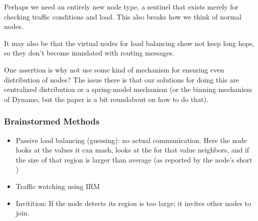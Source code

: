 Perhaps we need an entirely new node type, a sentinel that exists merely for checking traffic conditions and load.
This also breaks how we think of normal nodes.

It may also be that the virtual nodes for load balancing show not keep long hops, so they don't become inundated with routing messages.

One assertion is why not use some kind of mechanism for ensuring even distribution of nodes?
The issue there is that our solutions for doing this are centralized distribution or a spring-model mechanism (or the binning mechanism of Dynamo, but the paper is a bit roundabout on how to do that).

\subsubsection{Brainstormed Methods}


\begin{itemize}
	\item Passive load balancing (guessing):  no actual communication.
	Here the node looks at the values it can mash, looks at the for that value neighbors, and if the size of that region is larger than average (as reported by the node's short )
	\item Traffic watching using IRM
	\item Invitition:  If the node detects its region is too large; it invites other nodes to join.
\end{itemize}

